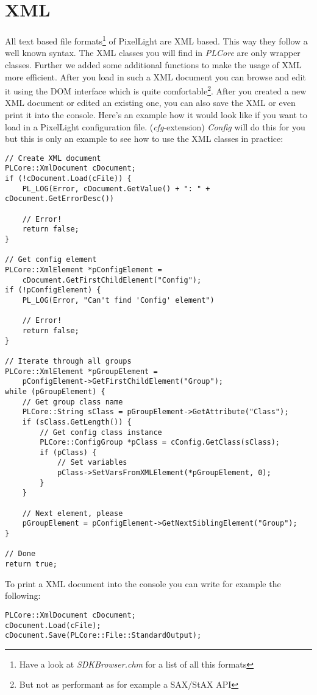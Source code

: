 \section{\ac{XML}}
All text based file formats\footnote{Have a look at \emph{SDKBrowser.chm} for a list of all this formats} of PixelLight are \ac{XML} based. This way they follow a well known syntax. The \ac{XML} classes you will find in \emph{PLCore} are only wrapper classes. Further we added some additional functions to make the usage of \ac{XML} more efficient. After you load in such a \ac{XML} document you can browse and edit it using the \ac{DOM} interface which is quite comfortable\footnote{But not as performant as for example a SAX/StAX \ac{API}}. After you created a new \ac{XML} document or edited an existing one, you can also save the \ac{XML} or even print it into the console. Here's an example how it would look like if you want to load in a PixelLight configuration file. (\emph{cfg}-extension) \emph{Config} will do this for you but this is only an example to see how to use the \ac{XML} classes in practice:

\begin{lstlisting}[caption=\ac{XML} \ac{DOM} usage example]
// Create XML document
PLCore::XmlDocument cDocument;
if (!cDocument.Load(cFile)) {
	PL_LOG(Error, cDocument.GetValue() + ": " + cDocument.GetErrorDesc())

	// Error!
	return false;
}

// Get config element
PLCore::XmlElement *pConfigElement =
	cDocument.GetFirstChildElement("Config");
if (!pConfigElement) {
	PL_LOG(Error, "Can't find 'Config' element")

	// Error!
	return false;
}

// Iterate through all groups
PLCore::XmlElement *pGroupElement =
	pConfigElement->GetFirstChildElement("Group");
while (pGroupElement) {
	// Get group class name
	PLCore::String sClass = pGroupElement->GetAttribute("Class");
	if (sClass.GetLength()) {
		// Get config class instance
		PLCore::ConfigGroup *pClass = cConfig.GetClass(sClass);
		if (pClass) {
			// Set variables
			pClass->SetVarsFromXMLElement(*pGroupElement, 0);
		}
	}

	// Next element, please
	pGroupElement = pConfigElement->GetNextSiblingElement("Group");
}

// Done
return true;
\end{lstlisting}

To print a \ac{XML} document into the console you can write for example the following:

\begin{lstlisting}[caption=Print \ac{XML} document into the console]
PLCore::XmlDocument cDocument;
cDocument.Load(cFile);
cDocument.Save(PLCore::File::StandardOutput);
\end{lstlisting}
